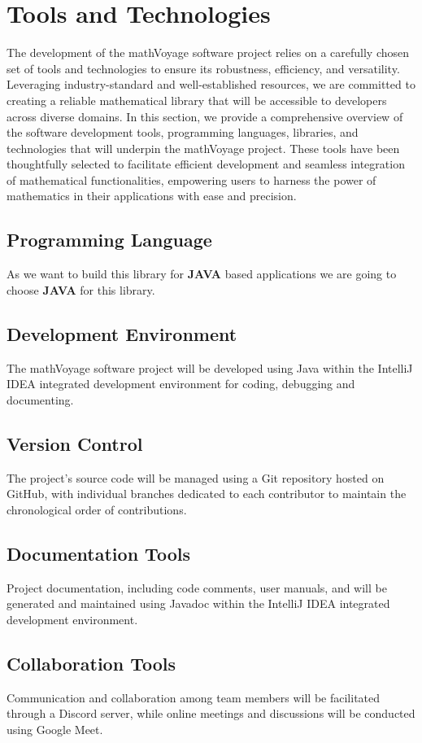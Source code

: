 \chapter{Tools and Technologies}
The development of the mathVoyage software project relies on a carefully chosen set of tools and technologies to ensure its robustness, efficiency, and versatility. Leveraging industry-standard and well-established resources, we are committed to creating a reliable mathematical library that will be accessible to developers across diverse domains. In this section, we provide a comprehensive overview of the software development tools, programming languages, libraries, and technologies that will underpin the mathVoyage project. These tools have been thoughtfully selected to facilitate efficient development and seamless integration of mathematical functionalities, empowering users to harness the power of mathematics in their applications with ease and precision.

\section{Programming Language}
As we want to build this library for \textbf{JAVA} based applications we are going to choose \textbf{JAVA} for this library.

\section{Development Environment}
The mathVoyage software project will be developed using Java within the IntelliJ IDEA integrated development environment for coding, debugging and documenting.

\section{Version Control}
The project's source code will be managed using a Git repository hosted on GitHub, with individual branches dedicated to each contributor to maintain the chronological order of contributions.

\section{Documentation Tools}
Project documentation, including code comments, user manuals, and will be generated and maintained using Javadoc within the IntelliJ IDEA integrated development environment.

\section{Collaboration Tools}
Communication and collaboration among team members will be facilitated through a Discord server, while online meetings and discussions will be conducted using Google Meet.

